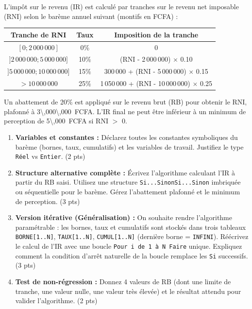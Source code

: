 \documentclass[11pt]{article}
\begin{document}
\begin{exercice}
L'impôt sur le revenu (IR) est calculé par tranches sur le revenu net imposable (RNI) selon le barème annuel suivant (montifs en FCFA) :
\begin{center}
\begin{tabular}{|c|c|c|}
\hline Tranche de RNI & Taux & Imposition de la tranche \\ \hline
$[0; 2\,000\,000]$ & 0\% & 0 \\
$]2\,000\,000; 5\,000\,000]$ & 10\% & (RNI - 2\,000\,000) $\times$ 0.10 \\
$]5\,000\,000; 10\,000\,000]$ & 15\% & 300\,000 + (RNI - 5\,000\,000) $\times$ 0.15 \\
$> 10\,000\,000$ & 25\% & 1\,050\,000 + (RNI - 10\,000\,000) $\times$ 0.25 \\ \hline
\end{tabular}
\end{center}
Un abattement de 20\% est appliqué sur le revenu brut (RB) pour obtenir le RNI, plafonné à \SI{3\,000\,000}{FCFA}. L'IR final ne peut être inférieur à un minimum de perception de \SI{5\,000}{FCFA} si RNI $>$ 0.

\begin{enumerate}
    \item \textbf{Variables et constantes :} Déclarez toutes les constantes symboliques du barème (bornes, taux, cumulatifs) et les variables de travail. Justifiez le type \texttt{Réel} vs \texttt{Entier}. (2 pts)
    \item \textbf{Structure alternative complète :} Écrivez l'algorithme calculant l'IR à partir du RB saisi. Utilisez une structure \texttt{Si...SinonSi...Sinon} imbriquée ou séquentielle pour le barème. Gérez l'abattement plafonné et le minimum de perception. (3 pts)
    \item \textbf{Version itérative (Généralisation) :} On souhaite rendre l'algorithme paramétrable : les bornes, taux et cumulatifs sont stockés dans trois tableaux \texttt{BORNE[1..N]}, \texttt{TAUX[1..N]}, \texttt{CUMUL[1..N]} (dernière borne = \texttt{INFINI}). Réécrivez le calcul de l'IR avec une boucle \texttt{Pour i de 1 à N Faire} unique. Expliquez comment la condition d'arrêt naturelle de la boucle remplace les \texttt{Si} successifs. (3 pts)
    \item \textbf{Test de non-régression :} Donnez 4 valeurs de RB (dont une limite de tranche, une valeur nulle, une valeur très élevée) et le résultat attendu pour valider l'algorithme. (2 pts)
\end{enumerate}
\end{exercice}
\end{document}
